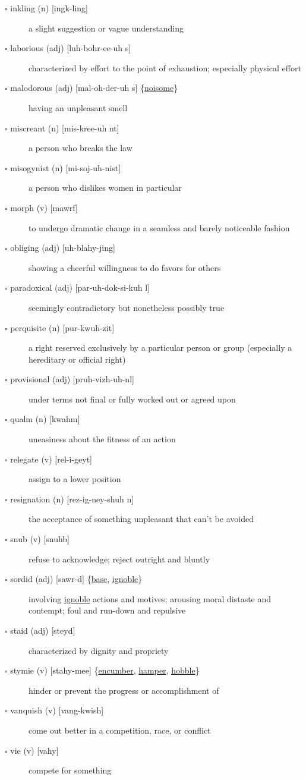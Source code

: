 \documentclass[11pt]{article}
\begin{document}
\begin{description}
\item[{$\square$ inkling (n) [ingk-ling]}] a slight suggestion or vague understanding
\item[{$\square$ laborious (adj) [luh-bohr-ee-uh s]}] characterized by effort to the point of exhaustion; especially physical effort
\item[{$\square$ \label{orgc605993}malodorous (adj) [mal-oh-der-uh s] \{\hyperref[org35a15a1]{noisome}\}}] having an unpleasant smell
\item[{$\square$ miscreant (n) [mis-kree-uh nt]}] a person who breaks the law
\item[{$\square$ misogynist (n) [mi-soj-uh-nist]}] a person who dislikes women in particular
\item[{$\square$ morph (v) [mawrf]}] to undergo dramatic change in a seamless and barely noticeable fashion
\item[{$\square$ obliging (adj) [uh-blahy-jing]}] showing a cheerful willingness to do favors for others
\item[{$\square$ paradoxical (adj) [par-uh-dok-si-kuh l]}] seemingly contradictory but nonetheless possibly true
\item[{$\square$ perquisite (n) [pur-kwuh-zit]}] a right reserved exclusively by a particular person or group (especially a hereditary or official right)
\item[{$\square$ provisional (adj) [pruh-vizh-uh-nl]}] under terms not final or fully worked out or agreed upon
\item[{$\square$ qualm (n) [kwahm]}] uneasiness about the fitness of an action
\item[{$\square$ relegate (v) [rel-i-geyt]}] assign to a lower position
\item[{$\square$ resignation (n) [rez-ig-ney-shuh n]}] the acceptance of something unpleasant that can't be avoided
\item[{$\square$ snub (v) [snuhb]}] refuse to acknowledge; reject outright and bluntly
\item[{$\square$ \label{org6a88c2e}sordid (adj) [sawr-d] \{\hyperref[org3f59f0a]{base}, \hyperref[orgda18690]{ignoble}\}}] involving \hyperref[orgda18690]{ignoble} actions and motives; arousing moral distaste and contempt; foul and run-down and repulsive
\item[{$\square$ staid (adj) [steyd]}] characterized by dignity and propriety
\item[{$\square$ \label{orgeb01fe1}stymie (v) [stahy-mee] \{\hyperref[org33c332c]{encumber}, \hyperref[org9f73bfc]{hamper}, \hyperref[org9c8bffd]{hobble}\}}] hinder or prevent the progress or accomplishment of
\item[{$\square$ vanquish (v) [vang-kwish]}] come out better in a competition, race, or conflict
\item[{$\square$ vie (v) [vahy]}] compete for something
\end{description}
\end{document}
